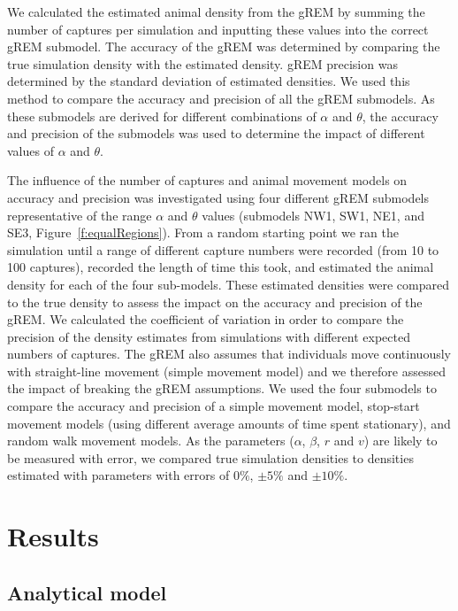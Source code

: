 \documentclass[a4paper,10pt,reqno,oneside]{amsart}
\begin{document}
We calculated the estimated animal density from the gREM by summing the number of captures per simulation and inputting these values into the correct gREM submodel. The accuracy of the gREM was determined by comparing the true simulation density with the estimated density. gREM precision was determined by the standard deviation of estimated densities. We used this method to compare the accuracy and precision of all the gREM submodels. As these submodels are derived for different combinations of $\alpha$ and $\theta$, the accuracy and precision of the submodels was used to determine the impact of different values of $\alpha$ and $\theta$. 

The influence of the number of captures and animal movement models on accuracy and precision was investigated using four different gREM submodels representative of the range $\alpha$ and $\theta$ values (submodels NW1, SW1, NE1, and SE3, Figure~\ref{f:equalRegions}). From a random starting point we ran the simulation until a range of different capture numbers were recorded (from 10 to 100 captures), recorded the length of time this took, and estimated the animal density for each of the four sub-models. These estimated densities were compared to the true density to assess the impact on the accuracy and precision of the gREM. We calculated the coefficient of variation in order to compare the precision of the density estimates from simulations with different expected numbers of captures. The gREM also assumes that individuals move continuously with straight-line movement (simple movement model) and we therefore assessed the impact of breaking the gREM assumptions. We used the four submodels to compare the accuracy and precision of a simple movement model, stop-start movement models (using different average amounts of time spent stationary), and random walk movement models. As the parameters ($\alpha$, $\beta$, $r$ and $v$) are likely to be measured with error, we compared true simulation densities to densities estimated with parameters with errors of $0\%$, $\pm 5\%$ and $\pm 10\%$.



\section*{Results}

\subsection*{Analytical model}
\end{document}
